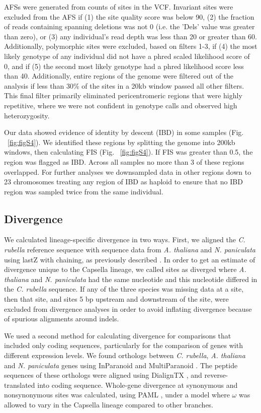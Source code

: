 AFSs were generated from counts of sites in the VCF. Invariant sites were excluded from the AFS if (1) the site quality score was below 90, (2) the fraction of reads containing spanning deletions was not 0 (i.e. the 'Dels' value was greater than zero), or (3) any individual's read depth was less than 20 or greater than 60. Additionally, polymorphic sites were excluded, based on filters 1-3, if (4) the most likely genotype of any individual did not have a phred scaled likelihood score of 0, and if (5) the second most likely genotype had a phred likelihood score less than 40. Additionally, entire regions of the genome were filtered out of the analysis if less than 30\% of the sites in a 20kb window passed all other filters. This final filter primarily eliminated pericentromeric regions that were highly repetitive, where we were not confident in genotype calls and observed high heterozygosity.

Our data showed evidence of identity by descent (IBD) in some samples (Fig. ~\ref{fig:figS4}). We identified these regions by splitting the genome into 200kb windows, then calculating FIS (Fig. ~\ref{fig:figS4}). If FIS was greater than 0.5, the region was flagged as IBD. Across all samples no more than 3 of these regions overlapped. For further analyses we downsampled data in other regions down to 23 chromosomes treating any region of IBD as haploid to ensure that no IBD region was sampled twice from the same individual.

\subsection{Divergence}

We calculated lineage-specific divergence in two ways. First, we aligned the \textit{C. rubella} reference sequence with sequence data from \textit{A. thaliana} and \textit{N. paniculata} using lastZ \citep{lastz} with chaining, as previously described \citep{Haudry2013-qe}. In order to get an estimate of divergence unique to the Capsella lineage, we called sites as diverged where \textit{A. thaliana} and \textit{N. paniculata} had the same nucleotide and this nucleotide differed in the \textit{C. rubella} sequence. If any of the three species was missing data at a site, then that site, and sites 5 bp upstream and downstream of the site, were excluded from divergence analyses in order to avoid inflating divergence because of spurious alignments around indels.

We used a second method for calculating divergence for comparisons that included only coding sequences, particularly for the comparison of genes with different expression levels. We found orthologs between \textit{C. rubella}, \textit{A. thaliana} and \textit{N. paniculata} genes using InParanoid \citep{inparanoid} and MultiParanoid \citep{multiparanoid}. The peptide sequences of these orthologs were aligned using DialignTX \citep{dialign}, and reverse-translated into coding sequence. Whole-gene divergence at synonymous and nonsynonymous sites was calculated, using PAML \citep{paml}, under a model where $\omega$ was allowed to vary in the Capsella lineage compared to other branches.

